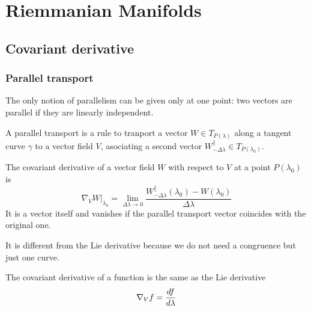 \part{Riemmanian Manifolds}

\chapter{Covariant derivative}

\section{Parallel transport}

    The only notion of parallelism can be given only at one point: two vectors are parallel if they are linearly independent. 

    \begin{definition}
        A parallel transport is a rule to tranport a vector $W \in T_{P(\lambda)}$ along a tangent curve $\gamma$ to a vector field $V$, asociating a second vector $W^{\parallel}_{-\Delta \lambda} \in T_{P(\lambda_0)}$.
    \end{definition}

    \begin{definition}
        The covariant derivative of a vector field $W$ with respect to $V$ at a point $P(\lambda_0)$ is 
        \begin{equation*}
            \nabla_V W \vert_{\lambda_0} = \lim_{\Delta \lambda \rightarrow 0} \frac{W^{\parallel}_{- \Delta \lambda} (\lambda_0) - W(\lambda_0)}{\Delta \lambda}
        \end{equation*}
        It is a vector itself and vanishes if the parallel transport vector coincides with the original one.
    \end{definition}

    It is different from the Lie derivative because we do not need a congruence but just one curve.

    The covariant derivative of a function is the same as the Lie derivative 
    \begin{equation*}
        \nabla_V f = \frac{df}{d\lambda}
    \end{equation*}

